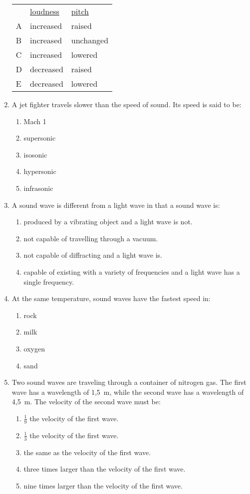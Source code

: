\begin{eocexercises}{}
\begin{enumerate}
\begin{tabular}{lll}
& \underline{loudness} & \underline{pitch}\\
A & increased & raised\\
B & increased & unchanged\\
C & increased & lowered\\
D & decreased & raised\\
E & decreased & lowered\\
\end{tabular}

\item A jet fighter travels slower than the speed of sound. Its speed is said to be:
\begin{enumerate}
\item Mach 1
\item supersonic
\item isosonic
\item hypersonic
\item infrasonic
\end{enumerate}

\item A sound wave is different from a light wave in that a sound wave is:
\begin{enumerate}
\item produced by a vibrating object and a light wave is not.
\item not capable of travelling through a vacuum.
\item not capable of diffracting and a light wave is.
\item capable of existing with a variety of frequencies and a light wave has a single frequency.
\end{enumerate}

\item At the same temperature, sound waves have the fastest speed in:
\begin{enumerate}
\item{rock}
\item{milk}
\item{oxygen}
\item{sand}
\end{enumerate}

\item Two sound waves are traveling through a container of nitrogen gas. The first wave has a wavelength of 1,5~m, while the second wave has a wavelength of 4,5~m. The velocity of the second wave must be:
\begin{enumerate}
\item{$\frac{1}{9}$ the velocity of the first wave.}
\item{$\frac{1}{3}$ the velocity of the first wave.}
\item{the same as the velocity of the first wave.}
\item{three times larger than the velocity of the first wave.}
\item{nine times larger than the velocity of the first wave.}
\end{enumerate}


\end{enumerate}
\end{eocexercises}
